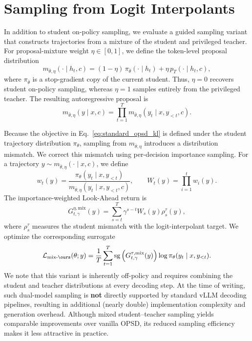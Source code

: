 \section{Sampling from Logit Interpolants}
\label{app:proposal_mixture}
In addition to student on-policy sampling, we evaluate a guided sampling variant that
constructs trajectories from a mixture of the student and privileged teacher. For proposal-mixture weight $\eta\in[0,1]$, we define the token-level proposal distribution
\begin{equation}
    m_{\bar{\theta},\eta}(\cdot\mid h_t,c)
    =
    (1-\eta)\,
    \pi_{\bar{\theta}}(\cdot\mid h_t)
    +
    \eta\,
    p_T(\cdot\mid h_t,c),
    \label{eq:student_teacher_mixed_sampler}
\end{equation}
where $\pi_{\bar{\theta}}$ is a stop-gradient copy of the current student. Thus,
$\eta=0$ recovers student on-policy sampling, whereas $\eta=1$ samples entirely from
the privileged teacher. The resulting autoregressive proposal is
\begin{equation}
    m_{\bar{\theta},\eta}(y\mid x,c)
    =
    \prod_{t=1}^{T}
    m_{\bar{\theta},\eta}(y_t\mid x,y_{<t},c).
    \label{eq:student_teacher_mixed_sequence}
\end{equation}

Because the objective in Eq.~\ref{eq:standard_opsd_kl} is defined under the student trajectory
distribution $\pi_\theta$, sampling from $m_{\bar{\theta},\eta}$ introduces a distribution
mismatch. We correct this mismatch using per-decision importance sampling. For a trajectory
$y\sim m_{\bar{\theta},\eta}(\cdot\mid x,c)$, we define
\begin{equation}
    w_t(y)
    =
    \frac{
    \pi_\theta(y_t\mid x,y_{<t})
    }{
    m_{\bar{\theta},\eta}(y_t\mid x,y_{<t},c)
    },
    \qquad
    W_t(y)
    =
    \prod_{i=1}^{t} w_i(y).
    \label{eq:mixed_sampling_importance_ratio}
\end{equation}
The importance-weighted Look-Ahead return is
\begin{equation}
    G_{t,\gamma}^{\eta,\mathrm{mix}}(y)
    =
    \sum_{s=t}^{T}
    \gamma^{s-t}
    W_s(y)\rho_s^\tau(y),
    \label{eq:mixed_sampling_lookahead_return}
\end{equation}
where $\rho_s^\tau$ measures the student mismatch with the logit-interpolant target. We optimize the corresponding
surrogate
\begin{equation}
    \mathcal{L}_{\mathrm{mix\text{-}\ours}}(\theta;y)
    =
    \frac{1}{T}
    \sum_{t=1}^{T}
    \operatorname{sg}
    \left(
    G_{t,\gamma}^{\tau,\mathrm{mix}}(y)
    \right)
    \log \pi_\theta(y_t\mid x,y_{<t}).
    \label{eq:mixed_sampling_lad_loss}
\end{equation}
We note that this variant is inherently off-policy and requires combining the student and
teacher distributions at every decoding step. At the time of writing, such dual-model sampling is \textbf{not} directly supported by standard vLLM decoding pipelines, resulting in additional (nearly double)
implementation complexity and generation overhead. Although mixed student--teacher
sampling yields comparable improvements over vanilla OPSD, its reduced
sampling efficiency makes it less attractive in practice. 

